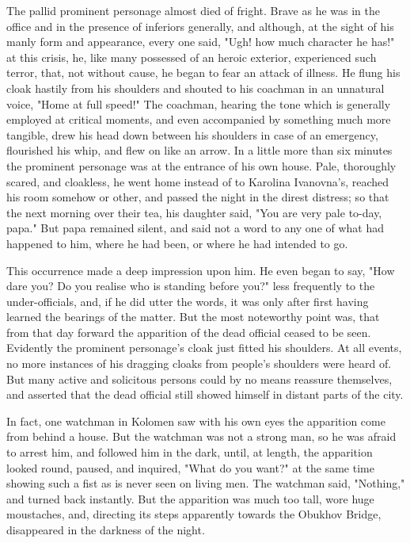 The pallid prominent personage almost died of fright. Brave as he was
in the office and in the presence of inferiors generally, and
although, at the sight of his manly form and appearance, every one
said, "Ugh! how much character he has!" at this crisis, he, like many
possessed of an heroic exterior, experienced such terror, that, not
without cause, he began to fear an attack of illness. He flung his
cloak hastily from his shoulders and shouted to his coachman in an
unnatural voice, "Home at full speed!" The coachman, hearing the tone
which is generally employed at critical moments, and even accompanied
by something much more tangible, drew his head down between his
shoulders in case of an emergency, flourished his whip, and flew on
like an arrow. In a little more than six minutes the prominent
personage was at the entrance of his own house. Pale, thoroughly
scared, and cloakless, he went home instead of to Karolina Ivanovna's,
reached his room somehow or other, and passed the night in the direst
distress; so that the next morning over their tea, his daughter said,
"You are very pale to-day, papa." But papa remained silent, and said
not a word to any one of what had happened to him, where he had been,
or where he had intended to go.

This occurrence made a deep impression upon him. He even began to say,
"How dare you? Do you realise who is standing before you?" less
frequently to the under-officials, and, if he did utter the words, it
was only after first having learned the bearings of the matter. But
the most noteworthy point was, that from that day forward the
apparition of the dead official ceased to be seen. Evidently the
prominent personage's cloak just fitted his shoulders. At all events,
no more instances of his dragging cloaks from people's shoulders were
heard of. But many active and solicitous persons could by no means
reassure themselves, and asserted that the dead official still showed
himself in distant parts of the city.

In fact, one watchman in Kolomen saw with his own eyes the apparition
come from behind a house. But the watchman was not a strong man, so he
was afraid to arrest him, and followed him in the dark, until, at
length, the apparition looked round, paused, and inquired, "What do
you want?" at the same time showing such a fist as is never seen on
living men. The watchman said, "Nothing," and turned back instantly.
But the apparition was much too tall, wore huge moustaches, and,
directing its steps apparently towards the Obukhov Bridge, disappeared
in the darkness of the night.

